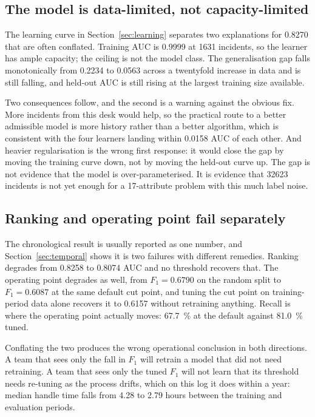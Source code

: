 \subsection{The model is data-limited, not capacity-limited}

The learning curve in Section~\ref{sec:learning} separates two explanations for
\num{0.8270} that are often conflated. Training AUC is \num{0.9999} at \num{1631} incidents,
so the learner has ample capacity; the ceiling is not the model class. The generalisation gap
falls monotonically from \num{0.2234} to \num{0.0563} across a twentyfold increase in data
and is still falling, and held-out AUC is still rising at the largest training size available.

Two consequences follow, and the second is a warning against the obvious fix. More incidents
from this desk would help, so the practical route to a better admissible model is more history
rather than a better algorithm, which is consistent with the four learners landing within
\num{0.0158} AUC of each other. And heavier regularisation is the wrong first response: it
would close the gap by moving the training curve down, not by moving the held-out curve up.
The gap is not evidence that the model is over-parameterised. It is evidence that
\num{32623} incidents is not yet enough for a 17-attribute problem with this much label noise.

\subsection{Ranking and operating point fail separately}

The chronological result is usually reported as one number, and Section~\ref{sec:temporal}
shows it is two failures with different remedies. Ranking degrades from \num{0.8258} to
\num{0.8074} AUC and no threshold recovers that. The operating point degrades as well, from
$F_1 = \num{0.6790}$ on the random split to $F_1 = \num{0.6087}$ at the same default cut point,
and tuning the cut point on training-period data alone recovers it to \num{0.6157} without
retraining anything. Recall is where the operating point actually moves: \SI{67.7}{\percent} at the
default against \SI{81.0}{\percent} tuned.

Conflating the two produces the wrong operational conclusion in both directions. A team that
sees only the fall in $F_1$ will retrain a model that did not need retraining. A team that
sees only the tuned $F_1$ will not learn that its threshold needs re-tuning as the process
drifts, which on this log it does within a year: median handle time falls from \num{4.28} to
\num{2.79} hours between the training and evaluation periods.

